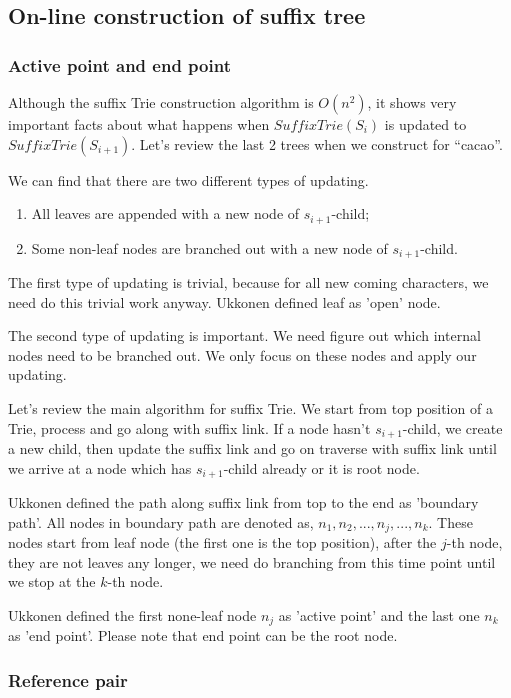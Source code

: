 \documentclass{article}
\begin{document}
\subsection{On-line construction of suffix tree} 

\subsubsection{Active point and end point}
\label{ap-and-ep}
Although the suffix Trie construction algorithm is $O(n^2)$, it shows very
important facts about what happens when $SuffixTrie(S_i)$ is updated to
$SuffixTrie(S_{i+1})$. Let's review the last 2 trees when we construct for
``cacao''.

We can find that there are two different types of updating.
\begin{enumerate}
\item All leaves are appended with a new node of $s_{i+1}$-child;
\item Some non-leaf nodes are branched out with a new node of $s_{i+1}$-child.
\end{enumerate}

The first type of updating is trivial, because for all new coming characters,
we need do this trivial work anyway. Ukkonen defined leaf as 'open' node.

The second type of updating is important. We need figure out which internal
nodes need to be branched out. We only focus on these nodes and apply our
updating.

Let's review the main algorithm for suffix Trie. We start from top position
of a Trie, process and go along with suffix link. If a node hasn't $s_{i+1}$-child,
we create a new child, then update the suffix link and go on traverse with
suffix link until we arrive at a node which has $s_{i+1}$-child already or
it is root node.

Ukkonen defined the path along suffix link from top to the end as 'boundary path'.
All nodes in boundary path are denoted as, $n_1, n_2, ..., n_j, ..., n_k$.
These nodes start from leaf node (the first one is the top position), after
the $j$-th node, they are not leaves any longer, we need do branching from
this time point until we stop at the $k$-th node.

Ukkonen defined the first none-leaf node $n_j$ as 'active point' and the last
one $n_k$ as 'end point'. Please note that end point can be the root node.

\subsubsection{Reference pair}
\end{document}
